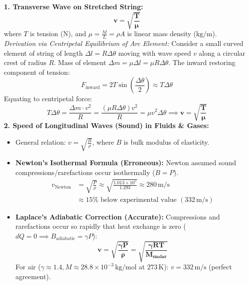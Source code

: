 \documentclass[10pt,twoside,openright]{book}
\begin{document}
\begin{formulabox}
\textbf{1. Transverse Wave on Stretched String:}
\begin{equation}
  \mathbf{v = \sqrt{\frac{T}{\mu}}}
\end{equation}
where $T$ is tension ($\mathrm{N}$), and $\mu = \frac{M}{L} = \rho A$ is linear mass density ($\mathrm{kg/m}$).
\textit{Derivation via Centripetal Equilibrium of Arc Element:}
Consider a small curved element of string of length $\Delta l = R \Delta\theta$ moving with wave speed $v$ along a circular crest of radius $R$. Mass of element $\Delta m = \mu \Delta l = \mu R \Delta\theta$.
The inward restoring component of tension:
\begin{equation}
  F_{\text{inward}} = 2 T \sin\left(\frac{\Delta\theta}{2}\right) \approx T \Delta\theta
\end{equation}
Equating to centripetal force:
\begin{equation}
  T \Delta\theta = \frac{\Delta m \cdot v^2}{R} = \frac{(\mu R \Delta\theta) v^2}{R} = \mu v^2 \Delta\theta \implies \mathbf{v = \sqrt{\frac{T}{\mu}}}
\end{equation}
\textbf{2. Speed of Longitudinal Waves (Sound) in Fluids \& Gases:}
\begin{itemize}
  \item General relation: $v = \sqrt{\frac{B}{\rho}}$, where $B$ is bulk modulus of elasticity.
  \item \textbf{Newton's Isothermal Formula (Erroneous):} Newton assumed sound compressions/rarefactions occur isothermally ($B = P$).
  \begin{align}
    v_{\text{Newton}} &= \sqrt{\frac{P}{\rho}} \approx \sqrt{\frac{1.013 \times 10^5}{1.293}} \approx 280\,\mathrm{m/s} \\
    &\approx 15\% \text{ below experimental value } (332\,\mathrm{m/s}) \nonumber
  \end{align}
  \item \textbf{Laplace's Adiabatic Correction (Accurate):} Compressions and rarefactions occur so rapidly that heat exchange is zero ($dQ=0 \implies B_{\text{adiabatic}} = \gamma P$):
  \begin{equation}
    \mathbf{v = \sqrt{\frac{\gamma P}{\rho}} = \sqrt{\frac{\gamma R T}{M_{\text{molar}}}}}
  \end{equation}
  For air ($\gamma \approx 1.4, M \approx 28.8 \times 10^{-3}\,\mathrm{kg/mol}$ at $273\,\mathrm{K}$): $v = 332\,\mathrm{m/s}$ (perfect agreement).

\end{itemize}
\end{formulabox}
\end{document}
